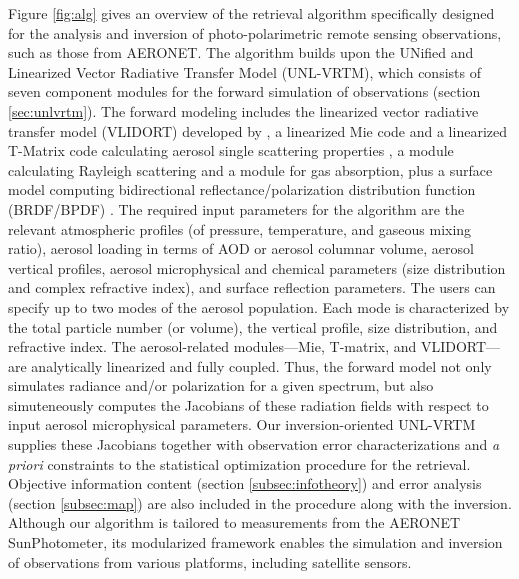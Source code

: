 Figure \ref{fig:alg} gives an overview of the retrieval algorithm specifically
designed for the analysis and inversion of photo-polarimetric remote
sensing observations, such as those from AERONET. The algorithm builds
upon the UNified and Linearized Vector Radiative Transfer Model
(UNL-VRTM), which consists of seven component modules for the forward
simulation of observations (section \ref{sec:unlvrtm}). The forward 
modeling includes the linearized vector
radiative transfer model (VLIDORT) developed by \citet{Spurr06}, a
linearized Mie code and a linearized T-Matrix code calculating aerosol
single scattering properties \citep{Spurr12}, a module calculating
Rayleigh scattering and a module for gas absorption, plus a surface
model computing bidirectional reflectance/polarization distribution
function (BRDF/BPDF) \citep{Spurr04}. The required input parameters for
the algorithm are the relevant atmospheric profiles (of pressure,
temperature, and gaseous mixing ratio), aerosol loading in terms of AOD
or aerosol columnar volume, aerosol vertical profiles, aerosol
microphysical and chemical parameters (size distribution and complex
refractive index), and surface reflection parameters. The users can
specify up to two modes of the aerosol population. Each mode is
characterized by the total particle number (or volume), the vertical
profile, size distribution, and refractive index. The aerosol-related
modules---Mie, T-matrix, and VLIDORT---are analytically linearized and fully
coupled. Thus, the forward model not only simulates radiance and/or
polarization for a given spectrum, but also simuteneously computes the Jacobians of
these radiation fields with respect to input aerosol microphysical
parameters. Our inversion-oriented UNL-VRTM supplies these Jacobians
together with observation error characterizations and \textit{a priori}
constraints to the statistical optimization procedure for the retrieval.
Objective information content (section \ref{subsec:infotheory}) and 
error analysis (section \ref{subsec:map}) are also included in the
procedure along with the inversion. Although our algorithm is tailored
to measurements from the AERONET SunPhotometer, its modularized
framework enables the simulation and inversion of observations from
various platforms, including satellite sensors. 

